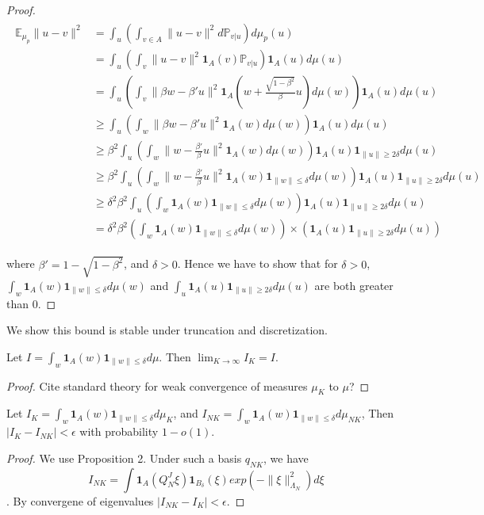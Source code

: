 \documentclass[final]{siamart0516}
\newcommand{\one}{\mathbf{1}}
\newcommand{\bbE}{\mathbb{E}}
\newcommand{\bbP}{\mathbb{P}}
\begin{document}
\begin{proof}
\begin{align}
\begin{aligned}
\bbE_{\mu_p} \|u - v\|^2 &= \int_u ( \int_{v\in A} \|u - v\|^2 d\bbP_{v|u}) d\mu_p(u)\\
&=  \int_u ( \int_{v} \|u - v\|^2 \one_A(v) \bbP_{v|u} ) \one_A(u) d\mu(u) \\
&= \int_u ( \int_{v} \|\beta w - \beta' u\|^2 \one_A(w  +\frac{\sqrt{1 - \beta^2}}{\beta} u) d\mu(w) ) \one_A(u) d\mu(u)\\
&\geq \int_u ( \int_{w} \|\beta w - \beta' u\|^2 \one_A(w) d\mu(w) ) \one_A(u)  d\mu(u) \\
&\geq \beta^2 \int_u( \int_{w} \|w - \frac{\beta'}{\beta} u\|^2 \one_A(w) d\mu(w)) \one_A(u) \one_{\|u\| \geq 2\delta} d\mu(u) \\ 
&\geq \beta^2 \int_u( \int_{w} \|w - \frac{\beta'}{\beta} u\|^2 \one_A(w) \one_{\|w\| \leq \delta} d\mu(w)) \one_A(u) \one_{\|u\| \geq 2\delta} d\mu(u) \\
&\geq \delta^2 \beta^2 \int_u( \int_{w} \one_A(w) \one_{\|w\| \leq \delta} d\mu(w)) \one_A(u) \one_{\|u\| \geq 2\delta} d\mu(u) \\
&= \delta^2 \beta^2 ( \int_{w} \one_A(w) \one_{\|w\| \leq \delta} d\mu(w)) \times (\one_A(u) \one_{\|u\| \geq 2\delta} d\mu(u) )
\end{aligned}
\end{align}

where $\beta' = 1 - \sqrt{1 - \beta^2}$, and $\delta > 0$. 
Hence we have to show that for $\delta > 0$,   $ \int_{w} \one_A(w) \one_{\|w\| \leq \delta} d\mu(w)$ and $\int_u \one_A(u) \one_{\|u\| \geq 2\delta} d\mu(u)$ are both greater than $0$. 
\end{proof}
We show this bound is stable under truncation and discretization.
\begin{proposition}
Let $I = \int_{w} \one_A(w) \one_{\|w\| \leq \delta} d\mu$. Then $\lim_{K \rightarrow \infty} I_K = I$. 
\end{proposition}
\begin{proof}
Cite standard theory for weak convergence of measures $\mu_K$ to $\mu$?
\end{proof}
\begin{proposition}
Let $I_K = \int_{w} \one_A(w) \one_{\|w\| \leq \delta} d\mu_K$, and $I_{NK} =  \int_{w} \one_A(w) \one_{\|w\| \leq \delta} d\mu_{NK}$, Then $|I_K - I_{NK}| < \epsilon$ with probability $1 - o(1)$. 
\end{proposition}
\begin{proof}
We use Proposition 2. Under such a basis $q_{NK}$, we have 
$$I_{NK} = \int \one_A(Q^J_N \xi) \one_{B_\delta}(\xi) exp(-\|\xi\|^2_{\Lambda_N}) d\xi$$. 
By convergene of eigenvalues $|I_{NK} - I_K| < \epsilon$. 
\end{proof}
\end{document}
